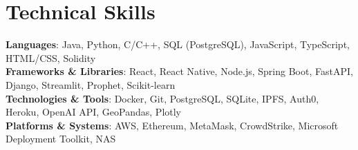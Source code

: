 \documentclass[letterpaper,11pt]{article}
\begin{document}
%
\section{Technical Skills}
 \begin{itemize}[leftmargin=0.15in, label={}]
    \small{\item{
     \textbf{Languages}{: Java, Python, C/C++, SQL (PostgreSQL), JavaScript, TypeScript, HTML/CSS, Solidity} \\
     \textbf{Frameworks \& Libraries}{: React, React Native, Node.js, Spring Boot, FastAPI, Django, Streamlit, Prophet, Scikit-learn} \\
     \textbf{Technologies \& Tools}{: Docker, Git, PostgreSQL, SQLite, IPFS, Auth0, Heroku, OpenAI API, GeoPandas, Plotly} \\
     \textbf{Platforms \& Systems}{: AWS, Ethereum, MetaMask, CrowdStrike, Microsoft Deployment Toolkit, NAS}
    }}
 \end{itemize}


\end{document}
